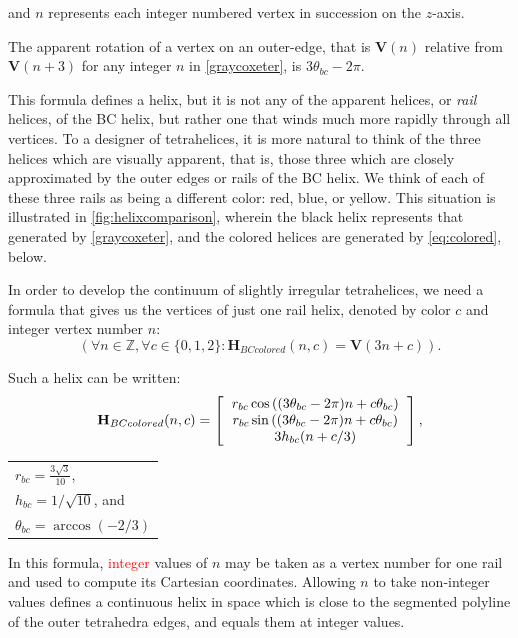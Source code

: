 \documentclass[twocolumn,10pt]{asme2ej}
\renewcommand{\vec}[1]{\mathbf{#1}}
\newcommand{\highlighttext}[1] {\textcolor{red}{#1}}
\begin{document}
and $n$ represents each integer numbered vertex in succession on the $z$-axis.

The apparent rotation of a vertex on an outer-edge, that is $\vec{V}(n)$ relative from $\vec{V}(n+3)$
for any integer $n$
in \cref{graycoxeter}, is $3 \theta_{bc} - 2\pi$.

This formula defines a helix, but it is not any of the apparent helices, or \emph{rail} helices, of the
BC helix, but rather one that winds much more rapidly through all
vertices. To a designer of tetrahelices, it is more natural to think of
the three helices which are visually apparent, that is, those three
which are closely approximated by the outer edges or rails of
the BC helix. We think of each of these three rails as being a different color: red, blue, or yellow.
This situation is illustrated in \cref{fig:helixcomparison}, wherein the black helix represents that
generated by \cref{graycoxeter},
and the colored helices are generated by \cref{eq:colored}, below. 



In order to develop the continuum of slightly irregular tetrahelices,
we need a formula that gives us the vertices of just
one rail helix, denoted by color $c$ and integer vertex number $n$:
\[
(\forall n \in \mathbb{Z}, \forall c \in \{0,1,2\} : \vec{H}_{BCcolored}(n,c) = \vec{V}(3n +c)) .
\]

Such a helix can be written:
\begin{equation}
  \label{eq:colored}
 \vec{H}_{BCcolored}(n,c) =
\left [
  \begin{tabular}{c}
   $ r_{bc}  \cos{((3 \theta_{bc} - 2 \pi)n + c  \theta_{bc})}  $\\
   $ r_{bc} \sin{((3 \theta_{bc} - 2 \pi)n + c  \theta_{bc})} $\\
   $ 3 h_{bc} (n + c/3)  $
  \end{tabular}
  \right ],
\end{equation}
  \begin{tabular}{l}
 $ r_{bc} = \frac{3\sqrt{3}}{10} $,\\
 $ h_{bc} = 1/\sqrt{10} $, and \\
 $ \theta_{bc} = \arccos(-2/3) $ \text{.}\\
  \end{tabular}      

In this formula, \highlighttext{integer} values of $n$ may be taken as a vertex number for one rail and used to compute
its Cartesian
coordinates. Allowing $n$ to take non-integer values defines a continuous
helix in space which is close to the segmented polyline of the outer
tetrahedra edges, and equals them at integer
values.
\end{document}
